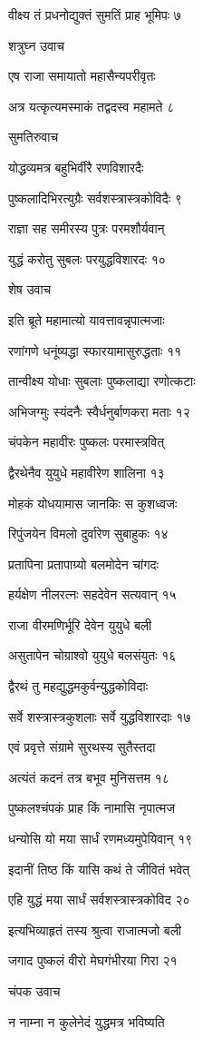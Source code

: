 वीक्ष्य तं प्रधनोद्युक्तं सुमतिं प्राह भूमिपः ७

शत्रुघ्न उवाच

एष राजा समायातो महासैन्यपरीवृतः

अत्र यत्कृत्यमस्माकं तद्वदस्व महामते ८

सुमतिरुवाच

योद्धव्यमत्र बहुभिर्वीरै रणविशारदैः

पुष्कलादिभिरत्युग्रैः सर्वशस्त्रास्त्रकोविदैः ९

राज्ञा सह समीरस्य पुत्रः परमशौर्यवान्

युद्धं करोतु सुबलः परयुद्धविशारदः १०

शेष उवाच

इति ब्रूते महामात्यो यावत्तावन्नृपात्मजाः

रणांगणे धनूंष्यद्धा स्फारयामासुरुद्धताः ११

तान्वीक्ष्य योधाः सुबलाः पुष्कलाद्या रणोत्कटाः

अभिजग्मुः स्यंदनैः स्वैर्धनुर्बाणकरा मताः १२

चंपकेन महावीरः पुष्कलः परमास्त्रवित्

द्वैरथेनैव युयुधे महावीरेण शालिना १३

मोहकं योधयामास जानकिः स कुशध्वजः

रिपुंजयेन विमलो दुर्वारेण सुबाहुकः १४

प्रतापिना प्रतापाग्र्यो बलमोदेन चांगदः

हर्यक्षेण नीलरत्नः सहदेवेन सत्यवान् १५

राजा वीरमणिर्भूरि देवेन युयुधे बली

असुतापेन चोग्राश्वो युयुधे बलसंयुतः १६

द्वैरथं तु महद्युद्धमकुर्वन्युद्धकोविदाः

सर्वे शस्त्रास्त्रकुशलाः सर्वे युद्धविशारदाः १७

एवं प्रवृत्ते संग्रामे सुरथस्य सुतैस्तदा

अत्यंतं कदनं तत्र बभूव मुनिसत्तम १८

पुष्कलश्चंपकं प्राह किं नामासि नृपात्मज

धन्योसि यो मया सार्धं रणमध्यमुपेयिवान् १९

इदानीं तिष्ठ किं यासि कथं ते जीवितं भवेत्

एहि युद्धं मया सार्धं सर्वशस्त्रास्त्रकोविद २०

इत्यभिव्याहृतं तस्य श्रुत्वा राजात्मजो बली

जगाद पुष्कलं वीरो मेघगंभीरया गिरा २१

चंपक उवाच

न नाम्ना न कुलेनेदं युद्धमत्र भविष्यति

